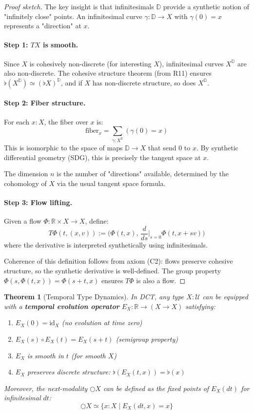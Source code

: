 \documentclass[11pt]{article}
\newtheorem{theorem}{Theorem}[section]
\theoremstyle{definition}
\begin{document}
\begin{proof}[Proof sketch]
The key insight is that infinitesimals $\mathbb{D}$ provide a synthetic notion of "infinitely close" points. An infinitesimal curve $\gamma : \mathbb{D} \to X$ with $\gamma(0) = x$ represents a "direction" at $x$.

\paragraph{Step 1: $TX$ is smooth.}
Since $X$ is cohesively non-discrete (for interesting $X$), infinitesimal curves $X^{\mathbb{D}}$ are also non-discrete. The cohesive structure theorem (from R11) ensures $\flat(X^{\mathbb{D}}) \simeq (\flat X)^{\mathbb{D}}$, and if $X$ has non-discrete structure, so does $X^{\mathbb{D}}$.

\paragraph{Step 2: Fiber structure.}
For each $x : X$, the fiber over $x$ is:
\[
\text{fiber}_x = \sum_{\gamma : X^{\mathbb{D}}} (\gamma(0) = x)
\]
This is isomorphic to the space of maps $\mathbb{D} \to X$ that send $0$ to $x$. By synthetic differential geometry (SDG), this is precisely the tangent space at $x$.

The dimension $n$ is the number of "directions" available, determined by the cohomology of $X$ via the usual tangent space formula.

\paragraph{Step 3: Flow lifting.}
Given a flow $\Phi : \mathbb{R} \times X \to X$, define:
\[
T\Phi(t, (x, v)) := \Big(\Phi(t,x),\, \frac{d}{ds}\Big|_{s=0} \Phi(t, x + sv)\Big)
\]
where the derivative is interpreted synthetically using infinitesimals.

Coherence of this definition follows from axiom (C2): flows preserve cohesive structure, so the synthetic derivative is well-defined. The group property $\Phi(s, \Phi(t, x)) = \Phi(s+t, x)$ ensures $T\Phi$ is also a flow.
\end{proof}

\begin{theorem}[Temporal Type Dynamics]
\label{thm:temporal-dynamics}
In DCT, any type $X : \mathcal{U}$ can be equipped with a \textbf{temporal evolution operator} $E_X : \mathbb{R} \to (X \to X)$ satisfying:
\begin{enumerate}
\item $E_X(0) = \text{id}_X$ (no evolution at time zero)
\item $E_X(s) \circ E_X(t) = E_X(s+t)$ (semigroup property)
\item $E_X$ is smooth in $t$ (for smooth $X$)
\item $E_X$ preserves discrete structure: $\flat(E_X(t, x)) = \flat(x)$
\end{enumerate}

Moreover, the next-modality $\bigcirc X$ can be defined as the fixed points of $E_X(dt)$ for infinitesimal $dt$:
\[
\bigcirc X \simeq \{x : X \mid E_X(dt, x) = x\}
\]
\end{theorem}
\end{document}
